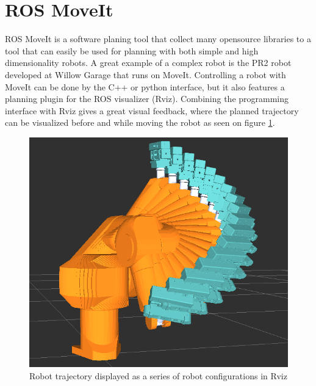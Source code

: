 \section{ROS MoveIt}
\label{sec:moveit}
ROS MoveIt is a software planing tool that collect many opensource libraries to a tool that can easily be used for planning with both simple and high dimensionality robots. A great example of a complex robot is the PR2 robot developed at Willow Garage that runs on MoveIt.
Controlling a robot with MoveIt can be done by the C++ or python interface, but it also features a planning plugin for the ROS visualizer (Rviz). Combining the programming interface with Rviz gives a great visual feedback, where the planned trajectory can be visualized before and while moving the robot as seen on figure \ref{fig:robot_trajectory}.

\begin{figure}[htb]
	\begin{center}
		\includegraphics[scale=0.5,trim=0 0 0 0]{graphics/05_robotics/robot_trajectory.png}%
		\caption{Robot trajectory displayed as a series of robot configurations in Rviz}
		\label{fig:robot_trajectory}
	\end{center}
\end{figure}

